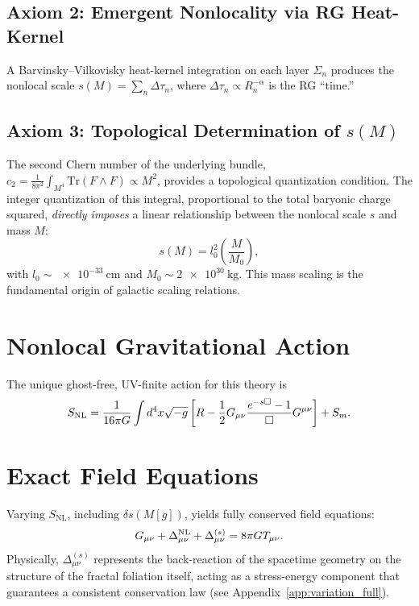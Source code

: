 \subsection{Axiom 2: Emergent Nonlocality via RG Heat-Kernel}
A Barvinsky--Vilkovisky heat-kernel integration on each layer $\Sigma_n$ produces the nonlocal scale $s(M) = \sum_n \Delta \tau_n$, where $\Delta \tau_n \propto R_n^{-\alpha}$ is the RG ``time.''

\subsection{Axiom 3: Topological Determination of $s(M)$}
The second Chern number of the underlying bundle, $c_2 = \frac{1}{8\pi^2} \int_{M^4} \mathrm{Tr}(F \wedge F) \propto M^2$, provides a topological quantization condition. The integer quantization of this integral, proportional to the total baryonic charge squared, \textit{directly imposes} a linear relationship between the nonlocal scale $s$ and mass $M$:
\begin{equation}
s(M) = l_0^2 \left( \frac{M}{M_0} \right),
\end{equation}
with $l_0 \sim \SI{e-33}{\centi\meter}$ and $M_0 \sim \SI{2e30}{\kilogram}$. This mass scaling is the fundamental origin of galactic scaling relations.

\section{Nonlocal Gravitational Action}
The unique ghost-free, UV-finite action for this theory is~\cite{Biswas2012,Modesto2014}
\begin{equation}
S_{\mathrm{NL}} = \frac{1}{16\pi G} \int d^4x \sqrt{-g} \left[ R - \frac{1}{2} G_{\mu\nu} \frac{e^{-s\Box} - 1}{\Box} G^{\mu\nu} \right] + S_m.
\end{equation}

\section{Exact Field Equations}
Varying $S_{\mathrm{NL}}$, including $\delta s(M[g])$, yields fully conserved field equations:
\begin{equation}
G_{\mu\nu} + \Delta_{\mu\nu}^{\mathrm{NL}} + \Delta_{\mu\nu}^{(s)} = 8\pi G T_{\mu\nu}.
\end{equation}
Physically, $\Delta_{\mu\nu}^{(s)}$ represents the back-reaction of the spacetime geometry on the structure of the fractal foliation itself, acting as a stress-energy component that guarantees a consistent conservation law (see Appendix~\ref{app:variation_full}).

